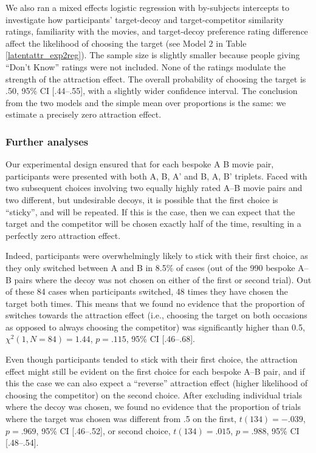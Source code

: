 \documentclass[12pt, a4paper]{article}
\begin{document}
We also ran a mixed effects logistic regression with by-subjects intercepts to investigate how participants' target-decoy and target-competitor similarity ratings, familiarity with the movies, and target-decoy preference rating difference affect the likelihood of choosing the target (see Model 2 in Table \ref{latentattr_exp2reg}). The sample size is slightly smaller because people giving ``Don't Know'' ratings were not included. None of the ratings modulate the strength of the attraction effect. The overall probability of choosing the target is .50, 95\% CI [.44--.55], with a slightly wider confidence interval. The conclusion from the two models and the simple mean over proportions is the same: we estimate a precisely zero attraction effect.

\subsubsection*{Further analyses}


Our experimental design ensured that for each bespoke A B movie pair, participants were presented with both A, B, A' and B, A, B' triplets. Faced with two subsequent choices involving two equally highly rated A--B movie pairs and two different, but undesirable decoys, it is possible that the first choice is  ``sticky'', and will be repeated. If this is the case, then we can expect that the target and the competitor will be chosen exactly half of the time, resulting in a perfectly zero attraction effect. 

Indeed, participants were overwhelmingly likely to stick with their first choice, as they only switched between A and B in 8.5\% of cases (out of the 990 bespoke A--B pairs where the decoy was not chosen on either of the first or second trial). Out of these 84 cases when participants switched, 48 times they have chosen the target both times. This means that we found no evidence that the proportion of switches towards the attraction effect (i.e., choosing the target on both occasions as opposed to always choosing the competitor) was significantly higher than 0.5, ${\chi}^2(1, N = 84)=1.44$, $p=.115$, 95\% CI [.46--.68].

Even though participants tended to stick with their first choice, the attraction effect might still be evident on the first choice for each bespoke A--B pair, and if this the case we can also expect a ``reverse'' attraction effect (higher likelihood of choosing the competitor) on the second choice. After excluding individual trials where the decoy was chosen, we found no evidence that the proportion of trials where the target was chosen was different from .5 on the first, $t(134)=-.039$, $p=.969$, 95\% CI [.46--.52], or second choice, $t(134)= .015$, $p=.988$, 95\% CI [.48--.54].
\end{document}
